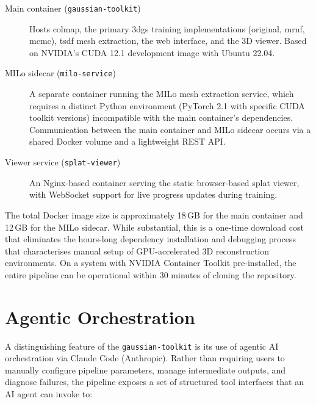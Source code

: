 \begin{description}
  \item[Main container (\texttt{gaussian-toolkit})] Hosts \acrshort{colmap}, the primary \acrshort{3dgs} training implementations (original, \acrshort{mrnf}, \acrshort{mcmc}), \acrshort{tsdf} mesh extraction, the web interface, and the 3D viewer. Based on NVIDIA's CUDA 12.1 development image with Ubuntu 22.04.

  \item[MILo sidecar (\texttt{milo-service})] A separate container running the MILo mesh extraction service, which requires a distinct Python environment (PyTorch 2.1 with specific CUDA toolkit versions) incompatible with the main container's dependencies. Communication between the main container and MILo sidecar occurs via a shared Docker volume and a lightweight REST API.

  \item[Viewer service (\texttt{splat-viewer})] An Nginx-based container serving the static browser-based splat viewer, with WebSocket support for live progress updates during training.
\end{description}

\begin{technote}
The total Docker image size is approximately 18\,GB for the main container and 12\,GB for the MILo sidecar. While substantial, this is a one-time download cost that eliminates the hours-long dependency installation and debugging process that characterises manual setup of GPU-accelerated 3D reconstruction environments. On a system with NVIDIA Container Toolkit pre-installed, the entire pipeline can be operational within 30 minutes of cloning the repository.
\end{technote}

\section{Agentic Orchestration}
\label{sec:pipe-agent}

A distinguishing feature of the \texttt{gaussian-toolkit} is its use of agentic AI orchestration via Claude Code (Anthropic). Rather than requiring users to manually configure pipeline parameters, manage intermediate outputs, and diagnose failures, the pipeline exposes a set of structured tool interfaces that an AI agent can invoke to:

